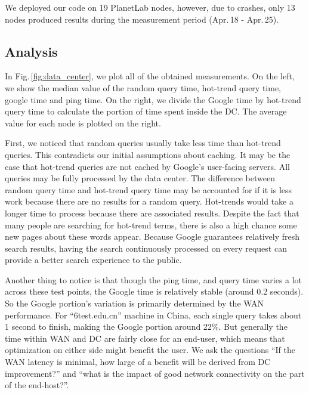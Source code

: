 We deployed our code on 19 PlanetLab nodes, however, due to crashes, only 13 nodes produced results during the measurement period (Apr.\,18 - Apr.\,25).

\subsection{Analysis}
\label{sec:analysis}

In Fig.\,\ref{fig:data_center}, we plot all of the obtained measurements. On the left, we show the median value of the random query time, hot-trend query time, google time and ping time. On the right, we divide the Google time by hot-trend query time to calculate the portion of time spent inside the DC. The average value for each node is plotted on the right.

First, we noticed that random queries usually take less time than hot-trend queries. This contradicts our initial assumptions about caching. It may be the case that hot-trend queries are not cached by Google's user-facing servers. All queries may be fully processed by the data center. The difference between random query time and hot-trend query time may be accounted for if it is less work because there are no results for a random query. Hot-trends would take a longer time to process because there are associated results.  Despite the fact that many people are searching for hot-trend terms, there is also a high chance some new pages about these words appear. Because Google guarantees relatively fresh search results, having the search continuously processed on every request can provide a better search experience to the public.

Another thing to notice is that though the ping time, and query time varies a lot across these test points, the Google time is relatively stable (around 0.2 seconds). So the Google portion's variation is primarily determined by the WAN performance. For ``6test.edu.cn'' machine in China, each single query takes about 1 second to finish, making the Google portion around 22\%. But generally the time within WAN and DC are fairly close for an end-user, which means that optimization on either side might benefit the user. We ask the questions ``If the WAN latency is minimal, how large of a benefit will be derived from DC improvement?'' and ``what is the impact of good network connectivity on the part of the end-host?''.

